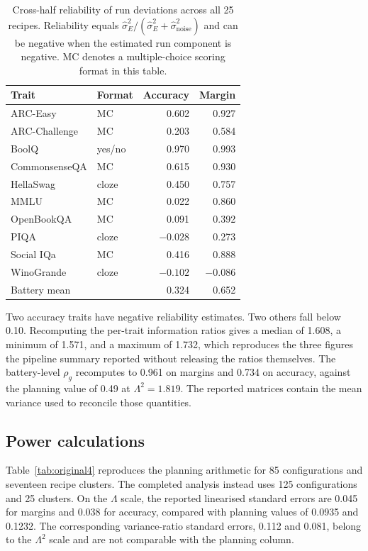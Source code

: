 \begin{table}[!htb]
\centering
\caption{Cross-half reliability of run deviations across all 25 recipes. Reliability equals $\widehat\sigma_E^2/(\widehat\sigma_E^2+\widehat\sigma_{\mathrm{noise}}^2)$ and can be negative when the estimated run component is negative. MC denotes a multiple-choice scoring format in this table.}
\label{tab:original3}
\small\setlength{\tabcolsep}{4pt}\renewcommand{\arraystretch}{1.12}
\begin{tabular}{llrr}\toprule
Trait & Format & Accuracy & Margin\\\midrule
ARC-Easy & MC & 0.602 & 0.927\\
ARC-Challenge & MC & 0.203 & 0.584\\
BoolQ & yes/no & 0.970 & 0.993\\
CommonsenseQA & MC & 0.615 & 0.930\\
HellaSwag & cloze & 0.450 & 0.757\\
MMLU & MC & 0.022 & 0.860\\
OpenBookQA & MC & 0.091 & 0.392\\
PIQA & cloze & $-0.028$ & 0.273\\
Social IQa & MC & 0.416 & 0.888\\
WinoGrande & cloze & $-0.102$ & $-0.086$\\
Battery mean & & 0.324 & 0.652\\\bottomrule
\end{tabular}
\end{table}

Two accuracy traits have negative reliability estimates. Two others fall below 0.10. Recomputing the per-trait information ratios gives a median of 1.608, a minimum of 1.571, and a maximum of 1.732, which reproduces the three figures the pipeline summary reported without releasing the ratios themselves. The battery-level $\rho_g$ recomputes to 0.961 on margins and 0.734 on accuracy, against the planning value of 0.49 at $\Lambda^2=1.819$. The reported matrices contain the mean variance used to reconcile those quantities.

\subsection{Power calculations}
Table~\ref{tab:original4} reproduces the planning arithmetic for 85 configurations and seventeen recipe clusters. The completed analysis instead uses 125 configurations and 25 clusters. On the $\Lambda$ scale, the reported linearised standard errors are 0.045 for margins and 0.038 for accuracy, compared with planning values of 0.0935 and 0.1232. The corresponding variance-ratio standard errors, 0.112 and 0.081, belong to the $\Lambda^2$ scale and are not comparable with the planning column.

